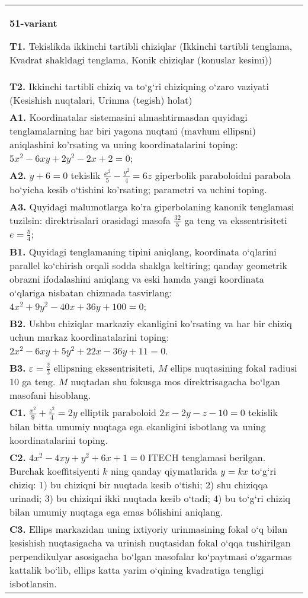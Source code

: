 \documentclass{article}
\begin{document}
\begin{tabular}{m{17cm}}
\textbf{51-variant}
\newline

\textbf{T1.} Tekislikda ikkinchi tartibli chiziqlar (Ikkinchi tartibli tenglama, Kvadrat shakldagi tenglama, Konik chiziqlar (konuslar kesimi)) \\
\textbf{T2.} Ikkinchi tartibli chiziq va to‘g‘ri chiziqning o‘zaro vaziyati (Kesishish nuqtalari, Urinma (tegish) holat) \\
\textbf{A1.} Koordinatalar sistemasini almashtirmasdan quyidagi tenglamalarning har biri yagona nuqtani (mavhum ellipsni) aniqlashini ko'rsating va uning koordinatalarini toping: $5 x^2-6 x y+2 y^2-2 x+2=0$; \\
\textbf{A2.} $y+6=0$ tekislik $\frac{x^2}{5}-\frac{y^2}{4}=6 z$ giperbolik paraboloidni parabola bo‘yicha kesib o‘tishini ko'rsating; parametri va uchini toping. \\
\textbf{A3.} Quyidagi malumotlarga ko'ra giperbolaning kanonik tenglamasi tuzilsin: direktrisalari orasidagi masofa $\frac{32}{5}$ ga teng va ekssentrisiteti $e=\frac{5}{4}$; \\
\textbf{B1.} Quyidagi tenglamaning tipini aniqlang, koordinata o‘qlarini parallel ko‘chirish orqali sodda shaklga keltiring; qanday geometrik obrazni ifodalashini aniqlang va eski hamda yangi koordinata o‘qlariga nisbatan chizmada tasvirlang: $4 x^2+9 y^2-40 x+36 y+100=0$; \\
\textbf{B2.} Ushbu chiziqlar markaziy ekanligini ko'rsating va har bir chiziq uchun markaz koordinatalarini toping: $2 x^2-6 x y+5 y^2+22 x-36 y+11=0$. \\
\textbf{B3.} $\varepsilon=\frac{2}{3}$ ellipsning ekssentrisiteti, $M$ ellips nuqtasining fokal radiusi 10 ga teng. $M$ nuqtadan shu fokusga mos direktrisagacha bo‘lgan masofani hisoblang. \\
\textbf{C1.} $\frac{x^2}{9}+\frac{z^2}{4}=2 y$ elliptik paraboloid $2 x-2 y-z-10=0$ tekislik bilan bitta umumiy nuqtaga ega ekanligini isbotlang va uning koordinatalarini toping. \\
\textbf{C2.} $4 x^2-4 x y+y^2+6 x+1=0$ ITECH tenglamasi berilgan. Burchak koeffitsiyenti $k$ ning qanday qiymatlarida $y=kx$ to‘g‘ri chiziq: 1) bu chiziqni bir nuqtada kesib o‘tishi; 2) shu chiziqqa urinadi; 3) bu chiziqni ikki nuqtada kesib o‘tadi; 4) bu to‘g‘ri chiziq bilan umumiy nuqtaga ega emas bólishini aniqlang. \\
\textbf{C3.} Ellips markazidan uning ixtiyoriy urinmasining fokal o‘q bilan kesishish nuqtasigacha va urinish nuqtasidan fokal o‘qqa tushirilgan perpendikulyar asosigacha bo‘lgan masofalar ko‘paytmasi o‘zgarmas kattalik bo‘lib, ellips katta yarim o‘qining kvadratiga tengligi isbotlansin. \\

\end{tabular}
\vspace{1cm}
\end{document}
